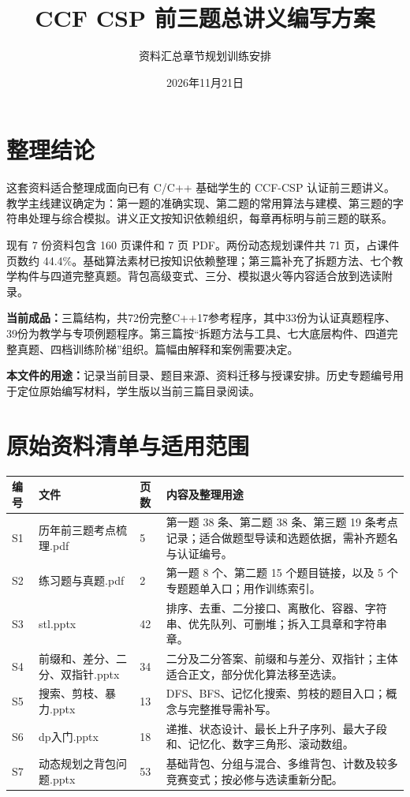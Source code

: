 \documentclass[UTF8,11pt,a4paper,fontset=none]{ctexart}
\title{\textbf{CCF CSP 前三题总讲义编写方案}}
\author{资料汇总\quad 章节规划\quad 训练安排}
\date{2026年11月21日}
\begin{document}
\maketitle

\section*{整理结论}
这套资料适合整理成面向已有 C/C++ 基础学生的 CCF-CSP 认证前三题讲义。教学主线建议确定为：第一题的准确实现、第二题的常用算法与建模、第三题的字符串处理与综合模拟。讲义正文按知识依赖组织，每章再标明与前三题的联系。

现有 7 份资料包含 160 页课件和 7 页 PDF。两份动态规划课件共 71 页，占课件页数约 44.4\%。基础算法素材已按知识依赖整理；第三篇补充了拆题方法、七个教学构件与四道完整真题。背包高级变式、三分、模拟退火等内容适合放到选读附录。

\textbf{当前成品：}三篇结构，共72份完整C++17参考程序，其中33份为认证真题程序、39份为教学与专项例题程序。第三篇按“拆题方法与工具、七大底层构件、四道完整真题、四档训练阶梯”组织。篇幅由解释和案例需要决定。

\textbf{本文件的用途：}记录当前目录、题目来源、资料迁移与授课安排。历史专题编号用于定位原始编写材料，学生版以当前三篇目录阅读。

\tableofcontents
\newpage

\section{原始资料清单与适用范围}
\begin{longtable}{P{0.7cm}P{4.5cm}P{1cm}P{8.6cm}}
\toprule 编号 & 文件 & 页数 & 内容及整理用途 \\\midrule\endhead
S1 & 历年前三题考点梳理.pdf & 5 & 第一题 38 条、第二题 38 条、第三题 19 条考点记录；适合做题型导读和选题依据，需补齐题名与认证编号。\\
S2 & 练习题与真题.pdf & 2 & 第一题 8 个、第二题 15 个题目链接，以及 5 个专题题单入口；用作训练索引。\\
S3 & stl.pptx & 42 & 排序、去重、二分接口、离散化、容器、字符串、优先队列、可删堆；拆入工具章和字符串章。\\
S4 & 前缀和、差分、二分、双指针.pptx & 34 & 二分及二分答案、前缀和与差分、双指针；主体适合正文，部分优化算法移至选读。\\
S5 & 搜索、剪枝、暴力.pptx & 13 & DFS、BFS、记忆化搜索、剪枝的题目入口；概念与完整推导需补写。\\
S6 & dp入门.pptx & 18 & 递推、状态设计、最长上升子序列、最大子段和、记忆化、数字三角形、滚动数组。\\
S7 & 动态规划之背包问题.pptx & 53 & 基础背包、分组与混合、多维背包、计数及较多竞赛变式；按必修与选读重新分配。\\
\bottomrule
\end{longtable}
\end{document}
